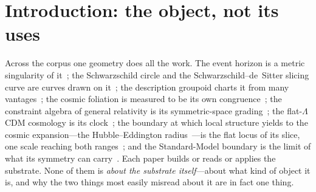 \documentclass[11pt,a4paper]{article}
\theoremstyle{definition}
\begin{document}
\begin{abstract}
It is therefore offered as a second way of seeing the object and not as evidence
for it; a reading that returned new physics from a theorem about circles would be
an object of suspicion, and one that returns what was already proved, from
unrelated directions, is doing what a faithful dictionary does. The frame is a physical theory of beautiful symmetric core
structures whose broken symmetries are the physics: the maximally symmetric
substrate $\mathrm{dS}_5$, the background $\mathrm{dS}_4$ its leaves carry,
and the exact solutions as symmetry-breaking cuts read as shadows off a
wall. 

The paper is written as the space the rest of the corpus lands in: the
slicing curve, the description groupoid, the constraint algebroid, the
cosmology, and the matter boundary each descend from this core and return
their consolidated content to it. 

The core is the seed the corpus grew from and the hub it returns to: the papers
descend from it and consolidate their content back into it, the connections their
propagation reveals gathered in as they are worked.
\end{abstract}

\section{Introduction: the object, not its uses}

Across the corpus one geometry does all the work. The event horizon is a
metric singularity of it~\cite{JanzenBHcausality}; the Schwarzschild circle
and the Schwarzschild--de~Sitter slicing curve are curves drawn on
it~\cite{JanzenCircle,JanzenSlicing}; the description groupoid charts it
from many vantages~\cite{JanzenGroupoid}; the cosmic foliation is measured
to be its own congruence~\cite{JanzenModernParallax}; the constraint algebra of
general relativity is its symmetric-space grading~\cite{JanzenAlgebroid};
the flat-$\Lambda$CDM cosmology is its clock~\cite{JanzenCRcosmology}; the
boundary at which local structure yields to the cosmic expansion---the
Hubble--Eddington radius~\cite{Eddington1933}---is the flat locus of its slice, one scale reaching
both ranges~\cite{JanzenSlicing,JanzenCRcosmology}; and
the Standard-Model boundary is the limit of what its symmetry can
carry~\cite{JanzenBoundary}. Each paper builds or reads or applies the
substrate. None of them is \emph{about the substrate itself}---about what
kind of object it is, and why the two things most easily misread about
it are in fact one thing.
\end{document}
